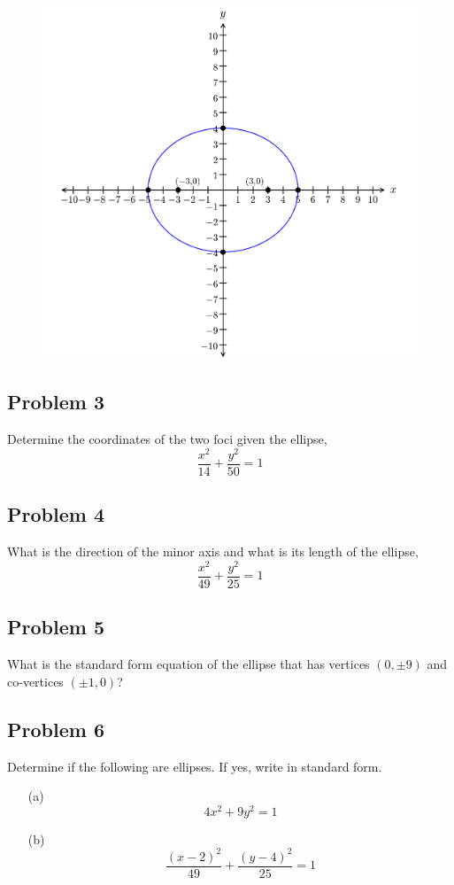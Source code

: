\documentclass[12pt]{article}
\begin{document}
\begin{figure}[!ht]
    \centering
    \includegraphics[width=1\linewidth]{2.png}
\end{figure}

\subsection*{Problem 3}
Determine the coordinates of the two foci given the ellipse,
\[\dfrac{x^2}{14}+\dfrac{y^2}{50}=1\]

\subsection*{Problem 4}
What is the direction of the minor axis and what is its length of the ellipse,
\[\dfrac{x^2}{49}+\dfrac{y^2}{25}=1\]

\subsection*{Problem 5}
What is the standard form equation of the ellipse that has vertices \((0, \pm 9)\) and co-vertices \((\pm 1,0)\)?

\subsection*{Problem 6}
Determine if the following are ellipses. If yes, write in standard form.
\begin{enumerate}
    \item[(a)] \[4x^2+9y^2=1\]
    \item[(b)] \[\dfrac{(x-2)^2}{49}+\dfrac{(y-4)^2}{25}=1\]
\end{enumerate}
\end{document}
